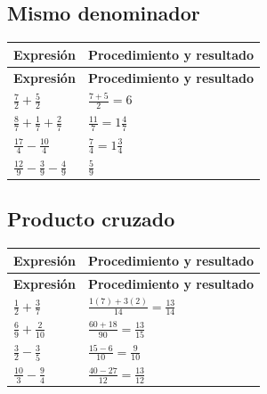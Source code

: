 \documentclass[spanish,letterpaper,oneside]{article}
\begin{document}
\subsection*{Mismo denominador}


{\small{}\renewcommand{\arraystretch}{1.25}
\begin{longtable}{|>{\raggedright\arraybackslash}p{}|>{\raggedright\arraybackslash}p{}|}\hline
\rowcolor{iiiepePale} \textbf{Expresión} & \textbf{Procedimiento y resultado} \\\hline
\endfirsthead
\hline
\rowcolor{iiiepePale} \textbf{Expresión} & \textbf{Procedimiento y resultado} \\\hline
\endhead
$\frac72+\frac52$ & $\frac{7+5}2=6$ \\\hline
$\frac87+\frac17+\frac27$ & $\frac{11}7=1\frac47$ \\\hline
$\frac{17}4-\frac{10}4$ & $\frac74=1\frac34$ \\\hline
$\frac{12}9-\frac39-\frac49$ & $\frac59$ \\\hline
\end{longtable}}

\subsection*{Producto cruzado}


{\small{}\renewcommand{\arraystretch}{1.25}
\begin{longtable}{|>{\raggedright\arraybackslash}p{}|>{\raggedright\arraybackslash}p{}|}\hline
\rowcolor{iiiepePale} \textbf{Expresión} & \textbf{Procedimiento y resultado} \\\hline
\endfirsthead
\hline
\rowcolor{iiiepePale} \textbf{Expresión} & \textbf{Procedimiento y resultado} \\\hline
\endhead
$\frac12+\frac37$ & $\frac{1(7)+3(2)}{14}=\frac{13}{14}$ \\\hline
$\frac69+\frac2{10}$ & $\frac{60+18}{90}=\frac{13}{15}$ \\\hline
$\frac32-\frac35$ & $\frac{15-6}{10}=\frac9{10}$ \\\hline
$\frac{10}3-\frac94$ & $\frac{40-27}{12}=\frac{13}{12}$ \\\hline
\end{longtable}}
\end{document}
